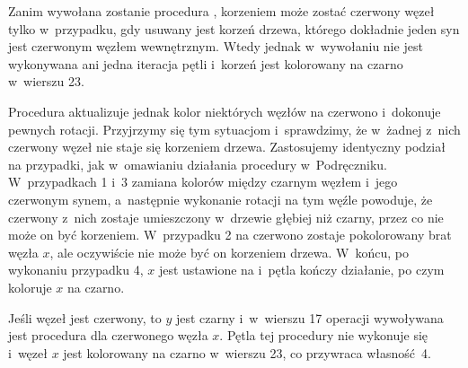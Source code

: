 \bignegskip

\exercise %
Zanim wywołana zostanie procedura , korzeniem może zostać czerwony węzeł tylko w~przypadku, gdy usuwany jest korzeń drzewa, którego dokładnie jeden syn jest czerwonym węzłem wewnętrznym.
Wtedy jednak w~wywołaniu  nie jest wykonywana ani jedna iteracja pętli  i~korzeń jest kolorowany na czarno w~wierszu 23.

Procedura  aktualizuje jednak kolor niektórych węzłów na czerwono i~dokonuje pewnych rotacji.
Przyjrzymy się tym sytuacjom i~sprawdzimy, że w~żadnej z~nich czerwony węzeł nie staje się korzeniem drzewa.
Zastosujemy identyczny podział na przypadki, jak w~omawianiu działania procedury w~Podręczniku.
W~przypadkach 1 i~3 zamiana kolorów między czarnym węzłem i~jego czerwonym synem, a~następnie wykonanie rotacji na tym węźle powoduje, że czerwony z~nich zostaje umieszczony w~drzewie głębiej niż czarny, przez co nie może on być korzeniem.
W~przypadku 2 na czerwono zostaje pokolorowany brat węzła $x$, ale oczywiście nie może być on korzeniem drzewa.
W~końcu, po wykonaniu przypadku 4, $x$ jest ustawione na  i~pętla kończy działanie, po czym koloruje $x$ na czarno.

\exercise %
Jeśli węzeł  jest czerwony, to $y$ jest czarny i~w~wierszu 17 operacji  wywoływana jest procedura  dla czerwonego węzła $x$.
Pętla  tej procedury nie wykonuje się i~węzeł $x$ jest kolorowany na czarno w~wierszu 23, co przywraca własność~4.

